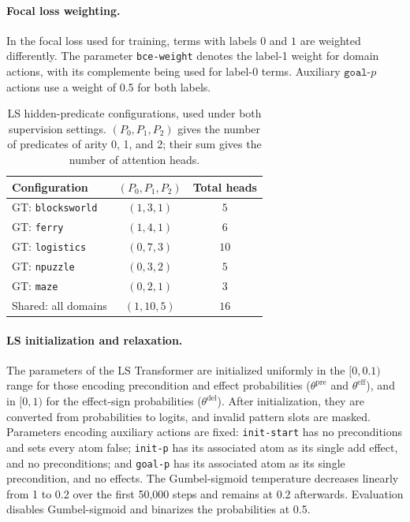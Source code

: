 \paragraph{Focal loss weighting.}
In the focal loss used for training, terms with labels $0$ and $1$ are weighted differently. The parameter \texttt{bce-weight} denotes the label-1 weight for domain actions, with its complemente being used for label-0 terms. Auxiliary $\texttt{goal-}p$ actions use a weight of 0.5 for both labels.

\begin{table}[!ht]
\centering
\caption{LS hidden-predicate configurations, used under both supervision
settings. $(P_0,P_1,P_2)$ gives the number of predicates of arity 0, 1, and 2;
their sum gives the number of attention heads.}
\label{tab:hidden-predicate-counts}
\small
\begin{tabular}{@{}lcc@{}}
\toprule
Configuration & $(P_0,P_1,P_2)$ & Total heads \\
\midrule
GT: \texttt{blocksworld} & $(1,3,1)$ & $5$ \\
GT: \texttt{ferry} & $(1,4,1)$ & $6$ \\
GT: \texttt{logistics} & $(0,7,3)$ & $10$ \\
GT: \texttt{npuzzle} & $(0,3,2)$ & $5$ \\
GT: \texttt{maze} & $(0,2,1)$ & $3$ \\
Shared: all domains & $(1,10,5)$ & $16$ \\
\bottomrule
\end{tabular}
\end{table}

\paragraph{LS initialization and relaxation.}
The parameters of the LS Transformer are initialized uniformly in
the $[0,0.1)$ range for those encoding precondition and effect probabilities ($\theta^{\text{pre}}$ and $\theta^{\text{eff}}$), and in $[0,1)$ for the effect-sign probabilities ($\theta^{\text{del}}$).
After initialization, they are converted from probabilities to logits,
and invalid pattern slots are masked.
Parameters encoding auxiliary actions are fixed:
\texttt{init-start} has no preconditions and sets every atom false;
\texttt{init-p} has its associated atom as its single add effect, and no preconditions;
and \texttt{goal-p} has its associated atom as its single precondition, and no effects.
The Gumbel-sigmoid temperature decreases linearly from 1 to 0.2 over the first
50,000 steps and remains at 0.2 afterwards.
Evaluation disables Gumbel-sigmoid and binarizes the probabilities
at 0.5.

